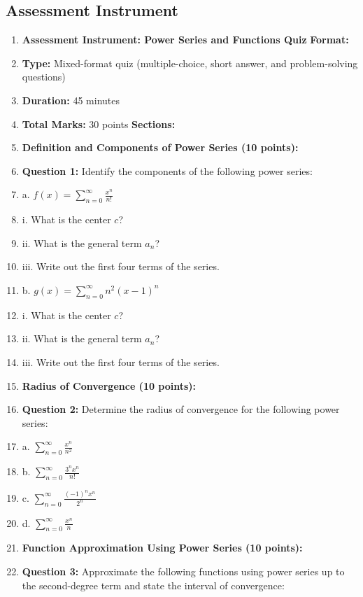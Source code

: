 \subsection{Assessment Instrument}

\begin{enumerate}
    \item \textbf{Assessment Instrument: Power Series and Functions Quiz} \textbf{Format:}
    \item \textbf{Type:} Mixed-format quiz (multiple-choice, short answer, and problem-solving questions)
    \item \textbf{Duration:} 45 minutes
    \item \textbf{Total Marks:} 30 points \textbf{Sections:}
    \item \textbf{Definition and Components of Power Series (10 points):}
    \item \textbf{Question 1:} Identify the components of the following power series:
    \item a. \( f(x) = \sum_{n=0}^{\infty} \frac{x^n}{n!} \)
    \item i. What is the center \(c\)?
    \item ii. What is the general term \(a_n\)?
    \item iii. Write out the first four terms of the series.
    \item b. \( g(x) = \sum_{n=0}^{\infty} n^2 (x-1)^n \)
    \item i. What is the center \(c\)?
    \item ii. What is the general term \(a_n\)?
    \item iii. Write out the first four terms of the series.
    \item \textbf{Radius of Convergence (10 points):}
    \item \textbf{Question 2:} Determine the radius of convergence for the following power series:
    \item a. \( \sum_{n=0}^{\infty} \frac{x^n}{n^2} \)
    \item b. \( \sum_{n=0}^{\infty} \frac{3^n x^n}{n!} \)
    \item c. \( \sum_{n=0}^{\infty} \frac{(-1)^n x^n}{2^n} \)
    \item d. \( \sum_{n=0}^{\infty} \frac{x^n}{n} \)
    \item \textbf{Function Approximation Using Power Series (10 points):}
    \item \textbf{Question 3:} Approximate the following functions using power series up to the second-degree term and state the interval of convergence:

\end{enumerate}

